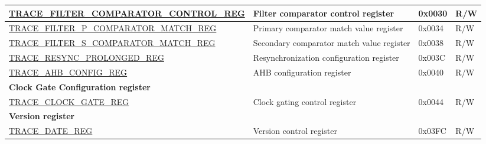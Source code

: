\begin{longtable}{ | p{8cm} | p{6.2cm} | p{1.3cm} | p{1cm} | }
\hyperref[regdesc:TRACEFILTERCOMPARATORCONTROLREG]{TRACE\_FILTER\_COMPARATOR\_CONTROL\_REG} & Filter comparator control register & 0x0030 & R/W \\ \hline
\hyperref[regdesc:TRACEFILTERPCOMPARATORMATCHREG]{TRACE\_FILTER\_P\_COMPARATOR\_MATCH\_REG} & Primary comparator match value register & 0x0034 & R/W \\ \hline
\hyperref[regdesc:TRACEFILTERSCOMPARATORMATCHREG]{TRACE\_FILTER\_S\_COMPARATOR\_MATCH\_REG} & Secondary comparator match value register & 0x0038 & R/W \\ \hline
\hyperref[regdesc:TRACERESYNCPROLONGEDREG]{TRACE\_RESYNC\_PROLONGED\_REG} & Resynchronization configuration register & 0x003C & R/W \\ \hline
\hyperref[regdesc:TRACEAHBCONFIGREG]{TRACE\_AHB\_CONFIG\_REG} & AHB configuration register & 0x0040 & R/W \\ \hline
\multicolumn{4}{|l|}{\textbf{Clock Gate Configuration register}} \\ \hline
\hyperref[regdesc:TRACECLOCKGATEREG]{TRACE\_CLOCK\_GATE\_REG} & Clock gating control register & 0x0044 & R/W \\ \hline
\multicolumn{4}{|l|}{\textbf{Version register}} \\ \hline
\hyperref[regdesc:TRACEDATEREG]{TRACE\_DATE\_REG} & Version control register & 0x03FC & R/W \\ \hline
\end{longtable}
